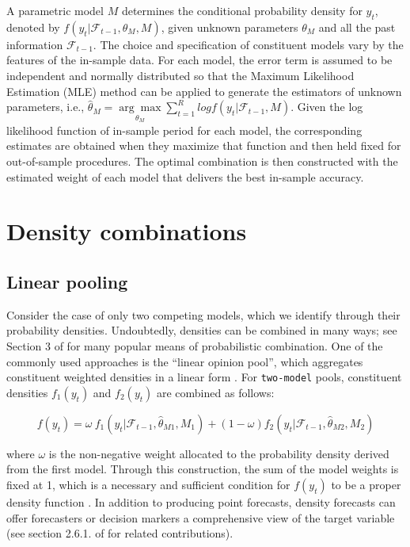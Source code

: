 \documentclass{monashthesis}
\begin{document}
A parametric model \(M\) determines the conditional probability density for \(y_t\), denoted by \(f(y_t|\mathcal{F}_{t-1}, \theta_M, M)\), given unknown parameters \(\theta_M\) and all the past information \(\mathcal{F}_{t-1}\). The choice and specification of constituent models vary by the features of the in-sample data. For each model, the error term is assumed to be independent and normally distributed so that the Maximum Likelihood Estimation (MLE) method can be applied to generate the estimators of unknown parameters, i.e., \(\hat\theta_M = \underset{\theta_M}{\arg\max} \sum^R_{t=1} log f(y_t|\mathcal{F}_{t-1}, M)\). Given the log likelihood function of in-sample period for each model, the corresponding estimates are obtained when they maximize that function and then held fixed for out-of-sample procedures. The optimal combination is then constructed with the estimated weight of each model that delivers the best in-sample accuracy.

\hypertarget{density-combinations}{%
\section{Density combinations}\label{density-combinations}}

\hypertarget{linear-pooling}{%
\subsection{Linear pooling}\label{linear-pooling}}

Consider the case of only two competing models, which we identify through their probability densities. Undoubtedly, densities can be combined in many ways; see Section 3 of \textcite{WHLK22} for many popular means of probabilistic combination. One of the commonly used approaches is the ``linear opinion pool'', which aggregates constituent weighted densities in a linear form \autocites[e.g.,][]{BG69,HM07,GA11}. For \texttt{two-model} pools, constituent densities \(f_1(y_t)\) and \(f_2(y_t)\) are combined as follows:

\begin{equation}
\label{eqn:LC1}
f(y_t) = \omega \ f_1(y_t | \mathcal{F}_{t-1}, \hat\theta_{M1}, M_1) + (1-\omega) f_2(y_t | \mathcal{F}_{t-1}, \hat\theta_{M2}, M_2)
\end{equation}

where \(\omega\) is the non-negative weight allocated to the probability density derived from the first model. Through this construction, the sum of the model weights is fixed at 1, which is a necessary and sufficient condition for \(f(y_t)\) to be a proper density function \autocite{GA11}. In addition to producing point forecasts, density forecasts can offer forecasters or decision markers a comprehensive view of the target variable (see section 2.6.1. of \textcite{FTP22} for related contributions).
\end{document}
